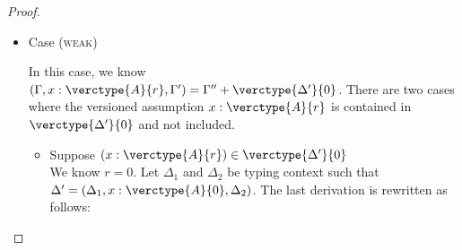 \begin{proof}
\begin{itemize}
\item Case (\textsc{weak})
\begin{center}
    \begin{minipage}{.4\linewidth}
    \end{minipage}
\end{center}

In this case, we know $(\Gamma, x:\verctype{A}{r}, \Gamma') = \Gamma'' + \verctype{\Delta'}{0}$.
There are two cases where the versioned assumption $x:\verctype{A}{r}$ is contained in $\verctype{\Delta'}{0}$ and not included.

\begin{itemize}
\item Suppose $(x:\verctype{A}{r})\in\verctype{\Delta'}{0}$\\
We know $r=0$.
Let $\Delta_1$ and $\Delta_2$ be typing context such that $\Delta' = (\Delta_1, x:\verctype{A}{0}, \Delta_2)$.
The last derivation is rewritten as follows:
\begin{center}
    \begin{minipage}{.55\linewidth}
    \end{minipage}
\end{center}


\end{itemize}
\end{itemize}
\end{proof}
